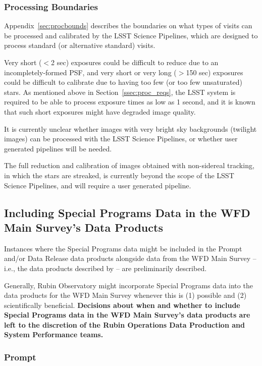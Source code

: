 \documentclass[DM,lsstdoc,toc]{lsstdoc}
\begin{document}
\subsubsection{Processing Boundaries}

Appendix~\ref{sec:procbounds} describes the boundaries on what types of visits can be processed and calibrated by the LSST Science Pipelines, which are designed to process standard (or alternative standard) visits.

Very short ($<$2 sec) exposures could be difficult to reduce due to an incompletely-formed PSF, and very short or very long ($>$150 sec) exposures could be difficult to calibrate due to having too few (or too few unsaturated) stars.
As mentioned above in Section~\ref{ssec:proc_reqs}, the LSST system is required to be able to process exposure times as low as 1 second, and it is known that such short exposures might have degraded image quality.

It is currently unclear whether images with very bright sky backgrounds (twilight images) can be processed with the LSST Science Pipelines, or whether user generated pipelines will be needed.

The full reduction and calibration of images obtained with non-sidereal tracking, in which the stars are streaked, is currently beyond the scope of the LSST Science Pipelines, and will require a user generated pipeline.




\subsection{Including Special Programs Data in the WFD Main Survey's Data Products}\label{ssec:proc_wfd}

Instances where the Special Programs data might be included in the Prompt and/or Data Release data products alongside data from the WFD Main Survey -- i.e., the data products described by  -- are preliminarily described.

Generally, Rubin Observatory might incorporate Special Programs data into the data products for the WFD Main Survey whenever this is (1) possible and (2) scientifically beneficial.
{\bf Decisions about when and whether to include Special Programs data in the WFD Main Survey's data products are left to the discretion of the Rubin Operations Data Production and System Performance teams.}

\subsubsection{Prompt}
\end{document}
